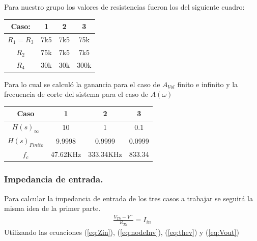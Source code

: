 Para nuestro grupo los valores de resistencias fueron los del siguiente cuadro:
\begin{table}[H]
\begin{center}
\begin{tabular}{|c|c|c|c|}
\hline
\textbf{Caso:}              & \textbf{1}               & \textbf{2}               & \textbf{3}                \\ \hline
$R_1=R_3$                   & 7k5                      & 7k5                      & 75k                       \\ \hline
$R_2$                       & 75k                      & 7k5                      & 7k5                       \\ \hline
\multicolumn{1}{|c|}{$R_4$} & \multicolumn{1}{l|}{30k} & \multicolumn{1}{l|}{30k} & \multicolumn{1}{l|}{300k} \\ \hline
\end{tabular}
\end{center}
\end{table}
Para lo cual se calculó la ganancia para el caso de $A_{Vol}$ finito e infinito y la frecuencia de corte del sistema para el caso de $A(\omega)$
\begin{table}[H]
\begin{center}
\begin{tabular}{|c|c|c|c|}
\hline
\textbf{Caso}            & \textbf{1} & \textbf{2} & \textbf{3} \\ \hline
\textbf{$H(s)_{\infty}$} & 10         & 1          & 0.1        \\ \hline
\textbf{$H(s)_{Finito}$} & 9.9998     & 0.9999     & 0.0999     \\ \hline
\textbf{$f_c$}           & 47.62KHz   & 333.34KHz  & 833.34     \\ \hline
\end{tabular}
\end{center}
\end{table}
\subsubsection{Impedancia de entrada.}

Para calcular la impedancia de entrada de los tres casos a trabajar se seguirá la misma idea de la primer parte.
\begin{align}
\label{eq:Zin}
\frac{V_{Th} - V^-}{R_{Th}}=I_{in}
\end{align}
Utilizando las ecuaciones (\ref{eq:Zin}), (\ref{eq:nodeInv}), (\ref{eq:thev}) y (\ref{eq:Vout})

